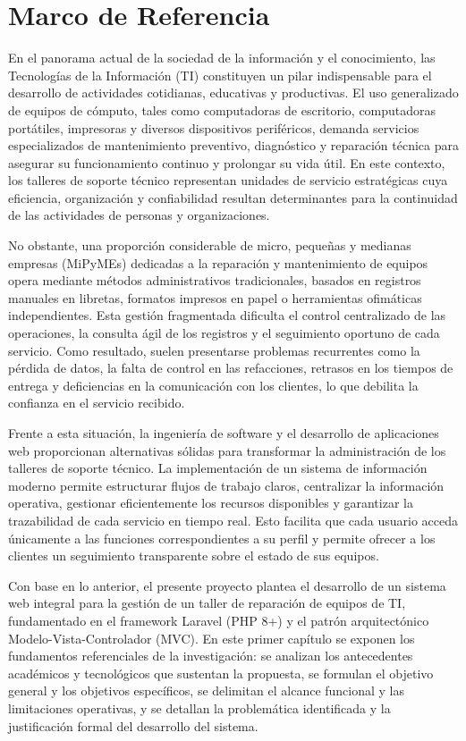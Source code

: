 \chapter{Marco de Referencia}

En el panorama actual de la sociedad de la información y el conocimiento, las Tecnologías de la Información (TI) constituyen un pilar indispensable para el desarrollo de actividades cotidianas, educativas y productivas. El uso generalizado de equipos de cómputo, tales como computadoras de escritorio, computadoras portátiles, impresoras y diversos dispositivos periféricos, demanda servicios especializados de mantenimiento preventivo, diagnóstico y reparación técnica para asegurar su funcionamiento continuo y prolongar su vida útil. En este contexto, los talleres de soporte técnico representan unidades de servicio estratégicas cuya eficiencia, organización y confiabilidad resultan determinantes para la continuidad de las actividades de personas y organizaciones.

No obstante, una proporción considerable de micro, pequeñas y medianas empresas (MiPyMEs) dedicadas a la reparación y mantenimiento de equipos opera mediante métodos administrativos tradicionales, basados en registros manuales en libretas, formatos impresos en papel o herramientas ofimáticas independientes. Esta gestión fragmentada dificulta el control centralizado de las operaciones, la consulta ágil de los registros y el seguimiento oportuno de cada servicio. Como resultado, suelen presentarse problemas recurrentes como la pérdida de datos, la falta de control en las refacciones, retrasos en los tiempos de entrega y deficiencias en la comunicación con los clientes, lo que debilita la confianza en el servicio recibido.

Frente a esta situación, la ingeniería de software y el desarrollo de aplicaciones web proporcionan alternativas sólidas para transformar la administración de los talleres de soporte técnico. La implementación de un sistema de información moderno permite estructurar flujos de trabajo claros, centralizar la información operativa, gestionar eficientemente los recursos disponibles y garantizar la trazabilidad de cada servicio en tiempo real. Esto facilita que cada usuario acceda únicamente a las funciones correspondientes a su perfil y permite ofrecer a los clientes un seguimiento transparente sobre el estado de sus equipos.

Con base en lo anterior, el presente proyecto plantea el desarrollo de un sistema web integral para la gestión de un taller de reparación de equipos de TI, fundamentado en el framework Laravel (PHP 8+) y el patrón arquitectónico Modelo-Vista-Controlador (MVC). En este primer capítulo se exponen los fundamentos referenciales de la investigación: se analizan los antecedentes académicos y tecnológicos que sustentan la propuesta, se formulan el objetivo general y los objetivos específicos, se delimitan el alcance funcional y las limitaciones operativas, y se detallan la problemática identificada y la justificación formal del desarrollo del sistema.

